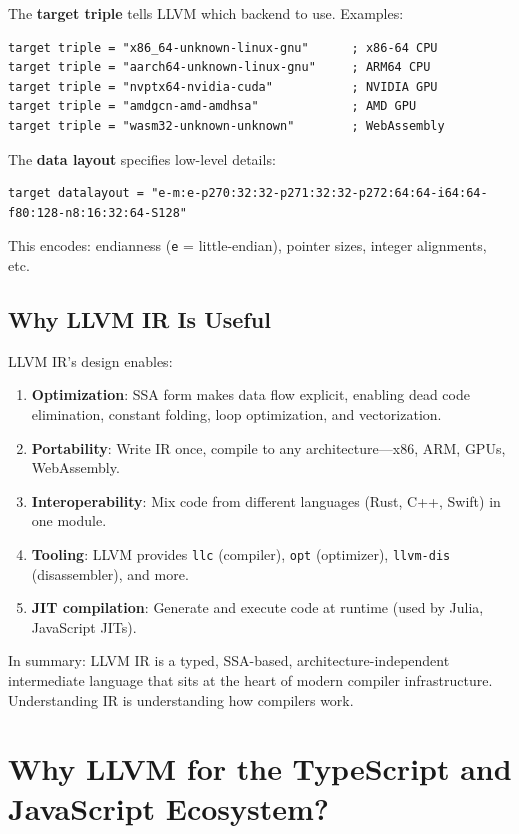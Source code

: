 \documentclass[11pt]{article}
\begin{document}
The \textbf{target triple} tells LLVM which backend to use. Examples:
\begin{lstlisting}[style=ir]
target triple = "x86_64-unknown-linux-gnu"      ; x86-64 CPU
target triple = "aarch64-unknown-linux-gnu"     ; ARM64 CPU
target triple = "nvptx64-nvidia-cuda"           ; NVIDIA GPU
target triple = "amdgcn-amd-amdhsa"             ; AMD GPU
target triple = "wasm32-unknown-unknown"        ; WebAssembly
\end{lstlisting}

The \textbf{data layout} specifies low-level details:
\begin{lstlisting}[style=ir]
target datalayout = "e-m:e-p270:32:32-p271:32:32-p272:64:64-i64:64-f80:128-n8:16:32:64-S128"
\end{lstlisting}

This encodes: endianness (\texttt{e} = little-endian), pointer sizes, integer alignments, etc.

\subsection{Why LLVM IR Is Useful}
LLVM IR's design enables:

\begin{enumerate}[noitemsep]
  \item \textbf{Optimization}: SSA form makes data flow explicit, enabling dead code elimination, constant folding, loop optimization, and vectorization.
  \item \textbf{Portability}: Write IR once, compile to any architecture—x86, ARM, GPUs, WebAssembly.
  \item \textbf{Interoperability}: Mix code from different languages (Rust, C++, Swift) in one module.
  \item \textbf{Tooling}: LLVM provides \texttt{llc} (compiler), \texttt{opt} (optimizer), \texttt{llvm-dis} (disassembler), and more.
  \item \textbf{JIT compilation}: Generate and execute code at runtime (used by Julia, JavaScript JITs).
\end{enumerate}

In summary: LLVM IR is a typed, SSA-based, architecture-independent intermediate language that sits at the heart of modern compiler infrastructure. Understanding IR is understanding how compilers work.

\section{Why LLVM for the TypeScript and JavaScript Ecosystem?}
\end{document}
